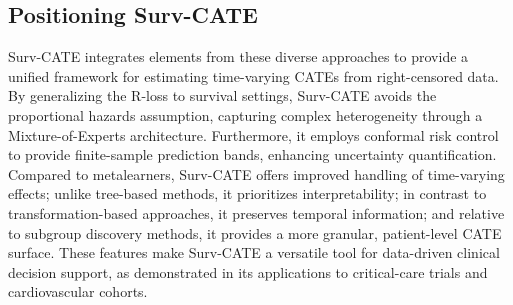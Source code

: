 \documentclass{article}
\begin{document}
\subsection{Positioning Surv-CATE}

Surv-CATE integrates elements from these diverse approaches to provide a unified framework for estimating time-varying CATEs from right-censored data. By generalizing the R-loss to survival settings, Surv-CATE avoids the proportional hazards assumption, capturing complex heterogeneity through a Mixture-of-Experts architecture. Furthermore, it employs conformal risk control to provide finite-sample prediction bands, enhancing uncertainty quantification. Compared to metalearners, Surv-CATE offers improved handling of time-varying effects; unlike tree-based methods, it prioritizes interpretability; in contrast to transformation-based approaches, it preserves temporal information; and relative to subgroup discovery methods, it provides a more granular, patient-level CATE surface. These features make Surv-CATE a versatile tool for data-driven clinical decision support, as demonstrated in its applications to critical-care trials and cardiovascular cohorts.
\end{document}
